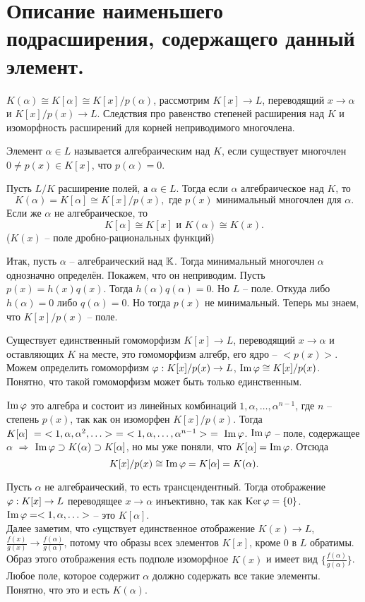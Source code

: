 \section{
 Описание наименьшего подрасширения, содержащего данный элемент.
 }


$K(\alpha) \cong K[\alpha] \cong K[x]/p(\alpha)$, рассмотрим $K[x] \to L$, переводящий $x \to \alpha$ и $K[x]/p(x) \to L$.
Следствия про равенство степеней расширения над $K$ и изоморфность расширений для корней неприводимого многочлена.

\dfn Элемент $\alpha \in L$ называется алгебраическим над $K$, если существует многочлен $0\neq p(x)\in K[x]$, что $p(\alpha)=0$. 
\edfn

\thrm Пусть $L/K$ расширение полей, а $\alpha \in L$. Тогда если $\alpha$ алгебраическое над $K$, то $$K(\alpha)=K[\alpha]\cong K[x]/p(x),  \text{ где $p(x)$ минимальный многочлен для $\alpha$}.$$
Если же $\alpha$ не алгебраическое, то $$K[\alpha]\cong K[x] \text{ и } K(\alpha) \cong K(x).$$
($K(x)$ -- поле дробно-рациональных функций)
\ethrm

\proof Итак, пусть $\alpha$ -- алгебраический над $\mathbb{K}$. Тогда минимальный многочлен $\alpha$ однозначно определён. Покажем, что он неприводим. Пусть $p(x)=h(x)q(x)$. Тогда $h(\alpha)q(\alpha)=0$. Но $L$ -- поле. Откуда либо $h(\alpha)=0$ либо $q(\alpha)=0$. Но тогда $p(x)$ не минимальный. Теперь мы знаем, что $K[x]/p(x)$ -- поле.

Существует единственный гомоморфизм $K[x]\to L$, переводящий $x \to \alpha$ и оставляющих $K$ на месте, это гомоморфизм алгебр, его ядро -- $<p(x)>$. Можем определить гомоморфизм $\varphi: K[x]/p(x) \to L$, $\operatorname{Im} \varphi \cong K[x]/p(x)$. 
Понятно, что такой гомоморфизм может быть только единственным.

$\operatorname{Im} \varphi$ это алгебра и состоит из линейных комбинаций $1,\alpha,\dots,\alpha^{n-1}$, где $n$ -- степень $p(x)$, так как он изоморфен $K[x]/p(x)$. Тогда $K[\alpha] ~=~ <1, \alpha, \alpha^2, \ldots> ~=~ <1, \alpha, \ldots, \alpha^{n-1}> ~=~ \operatorname{Im} \varphi$. $\operatorname{Im} \varphi$ -- поле, содержащее $\alpha$ $\Rightarrow$ $\operatorname{Im} \varphi \supset K(\alpha) \supset K[\alpha]$, но мы уже поняли, что $K[\alpha] = \operatorname{Im} \varphi$. Отсюда $$K[x]/p(x) \cong \operatorname{Im} \varphi = K[\alpha]=K(\alpha).$$

Пусть $\alpha$ не алгебраический, то есть трансцендентный. Тогда отображение $\varphi : K[x] \to L$ переводящее $x\to\alpha$ инъективно, так как $\operatorname{Ker} \varphi = \{0\}$. $\operatorname{Im} \varphi = <1, \alpha, \ldots>$ -- это $K[\alpha]$.\\ Далее заметим, что cущствует единственное отображение $K(x) \to L$, $\frac{f(x)}{g(x)} \to \frac{f(\alpha)}{g(\alpha)}$, потому что образы всех элементов $K[x]$, кроме 0 в $L$ обратимы. Образ этого отображения есть подполе изоморфное $K(x)$ и имеет вид $\{\frac{f(\alpha)}{g(\alpha)}\}$. Любое поле, которое содержит $\alpha$ должно содержать все такие элементы. Понятно, что это и есть $K(\alpha)$.   
\endproof


